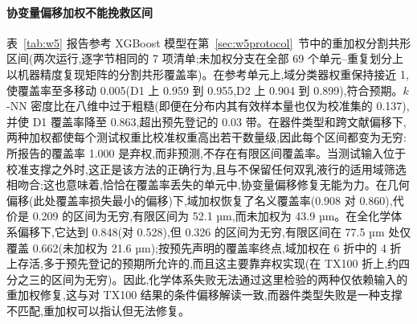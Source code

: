 \documentclass[11pt,a4paper]{ctexart}
\begin{document}
\paragraph{协变量偏移加权不能挽救区间} 表~\ref{tab:w5} 报告参考 XGBoost 模型在第~\ref{sec:w5protocol}~节中的重加权分割共形区间(两次运行,逐字节相同的 7 项清单;未加权分支在全部 69 个单元–重复划分上以机器精度复现矩阵的分割共形覆盖率)。在参考单元上,域分类器权重保持接近 1,使覆盖率至多移动 0.005(D1 上 0.959 到 0.955,D2 上 0.904 到 0.899),符合预期。$k$-NN 密度比在八维中过于粗糙(即便在分布内其有效样本量也仅为校准集的 0.137),并使 D1 覆盖率降至 0.863,超出预先登记的 0.03 带。在器件类型和跨文献偏移下,两种加权都使每个测试权重比校准权重高出若干数量级,因此每个区间都变为无穷:所报告的覆盖率 1.000 是弃权,而非预测,不存在有限区间覆盖率。当测试输入位于校准支撑之外时,这正是该方法的正确行为,且与不保留任何双乳液行的适用域筛选相吻合;这也意味着,恰恰在覆盖率丢失的单元中,协变量偏移修复无能为力。在几何偏移(此处覆盖率损失最小的偏移)下,域加权恢复了名义覆盖率(0.908 对 0.860),代价是 0.209 的区间为无穷,有限区间为 52.1 µm,而未加权为 43.9 µm。在全化学体系偏移下,它达到 0.848(对 0.528),但 0.326 的区间为无穷,有限区间在 77.5 µm 处仅覆盖 0.662(未加权为 21.6 µm);按预先声明的覆盖率终点,域加权在 6 折中的 4 折上存活,多于预先登记的预期所允许的,而且这主要靠弃权实现(在 TX100 折上,约四分之三的区间为无穷)。因此,化学体系失败无法通过这里检验的两种仅依赖输入的重加权修复,这与对 TX100 结果的条件偏移解读一致,而器件类型失败是一种支撑不匹配,重加权可以指认但无法修复。
\end{document}
